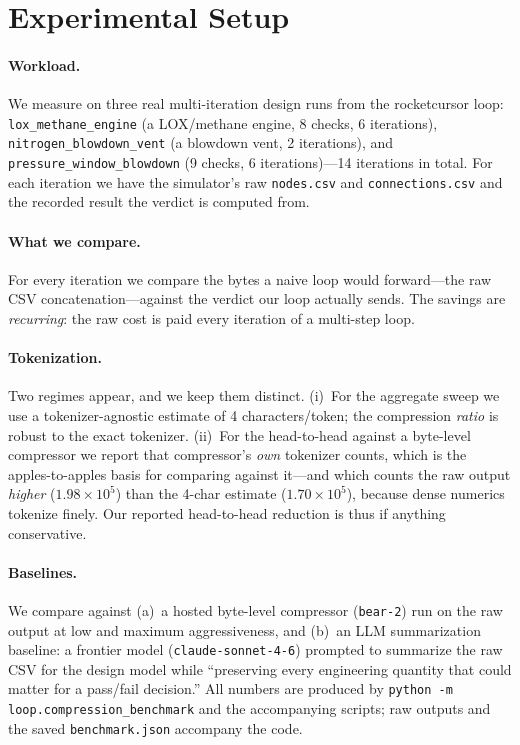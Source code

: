 \documentclass[10pt,twocolumn]{article}
\begin{document}
\section{Experimental Setup}
\label{sec:setup}

\paragraph{Workload.}
We measure on three real multi-iteration design runs from the rocketcursor loop:
\texttt{lox\_methane\_engine} (a LOX/methane engine, 8 checks, 6 iterations),
\texttt{nitrogen\_blowdown\_vent} (a blowdown vent, 2 iterations), and
\texttt{pressure\_window\_blowdown} (9 checks, 6 iterations)---14 iterations in
total. For each iteration we have the simulator's raw \texttt{nodes.csv} and
\texttt{connections.csv} and the recorded result the verdict is computed from.

\paragraph{What we compare.}
For every iteration we compare the bytes a naive loop would forward---the raw CSV
concatenation---against the verdict our loop actually sends. The savings are
\emph{recurring}: the raw cost is paid every iteration of a multi-step loop.

\paragraph{Tokenization.}
Two regimes appear, and we keep them distinct. (i)~For the aggregate sweep we use a
tokenizer-agnostic estimate of 4 characters/token; the compression \emph{ratio} is
robust to the exact tokenizer. (ii)~For the head-to-head against a byte-level
compressor we report that compressor's \emph{own} tokenizer counts, which is the
apples-to-apples basis for comparing against it---and which counts the raw output
\emph{higher} ($1.98\times10^{5}$) than the 4-char estimate ($1.70\times10^{5}$),
because dense numerics tokenize finely. Our reported head-to-head reduction is thus
if anything conservative.

\paragraph{Baselines.}
We compare against (a)~a hosted byte-level compressor (\texttt{bear-2}) run on the
raw output at low and maximum aggressiveness, and (b)~an LLM summarization baseline:
a frontier model (\texttt{claude-sonnet-4-6}) prompted to summarize the raw CSV for
the design model while ``preserving every engineering quantity that could matter for
a pass/fail decision.'' All numbers are produced by
\texttt{python -m loop.compression\_benchmark} and the accompanying scripts; raw
outputs and the saved \texttt{benchmark.json} accompany the code.
\end{document}
